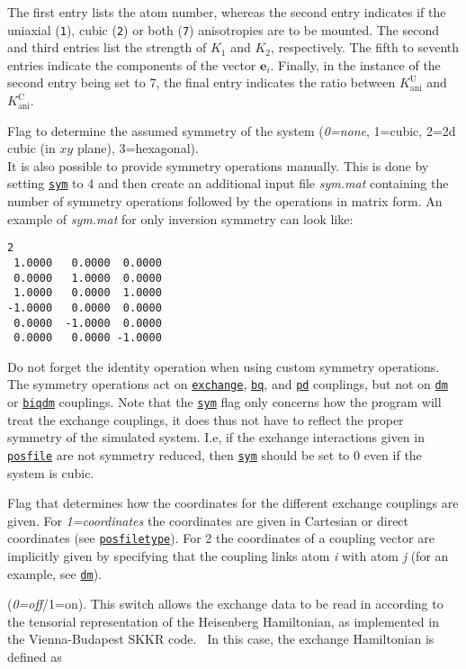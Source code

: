\documentclass[11pt,fleqn,a4]{book} %
\makeatletter
\newcommand{\litem}[1]{\item[\bfseries#1\index{#1@\texttt{#1}}\label{#1}]}
\newcommand{\rkeyword}[1]{\hyperref[#1]{\texttt{#1}}}
\makeatother
\begin{document}
\begin{description}[leftmargin=!,labelwidth=\widthof{\bfseries fifteenchars}]
The first entry lists the atom number, whereas the second entry indicates if the uniaxial (\texttt{1}), cubic (\texttt{2}) or both (\texttt{7}) anisotropies are to be mounted. The second and third entries list the strength of $K_1$ and $K_2$, respectively. The fifth to seventh entries indicate the components of the vector $\mathbf{e}_i$. Finally, in the instance of the second entry being set to 7, the final entry indicates the ratio between  $K^{\mathrm{U}}_{\mathrm{ani}}$ and  $K^{\mathrm{C}}_{\mathrm{ani}}$.

\litem{sym} Flag to determine the assumed symmetry of the system (\emph{0=none}, 1=cubic, 2=2d cubic (in $xy$ plane), 3=hexagonal). \\
            It is also possible to provide symmetry operations manually. This is done by setting \rkeyword{sym} to 4 and then create an additional input file
             {\it sym.mat} containing the number of symmetry operations followed by the operations in matrix form. 
            An example of {\it sym.mat} for only inversion symmetry can look like: 
\begin{fBox} 
\begin{Verbatim}
2 
 1.0000   0.0000  0.0000
 0.0000   1.0000  0.0000
 1.0000   0.0000  1.0000
-1.0000   0.0000  0.0000
 0.0000  -1.0000  0.0000
 0.0000   0.0000 -1.0000
\end{Verbatim}
\end{fBox}
        Do not forget the identity operation when using custom symmetry operations. The symmetry operations act on \rkeyword{exchange}, \rkeyword{bq}, and \rkeyword{pd} couplings, but not on \rkeyword{dm} or \rkeyword{biqdm} couplings. Note that the \rkeyword{sym} flag only concerns how the program will treat the exchange couplings, it does thus not have to reflect the proper symmetry of the simulated system. I.e, if the exchange interactions given in \rkeyword{posfile} are not symmetry reduced, then \rkeyword{sym} should be set to $0$ even if the system is cubic.
\litem{maptype} Flag that determines how the coordinates for the different exchange couplings are given. For \emph{1=coordinates} the coordinates are given in Cartesian or direct coordinates (see \rkeyword{posfiletype}). For 2 the coordinates of a coupling vector are implicitly given by specifying that the coupling links atom \textit{i} with atom \textit{j} (for an example, see \rkeyword{dm}).
\litem{do_jtensor} (\emph{0=off}/1=on). This switch allows the exchange data to be read in according to the tensorial representation of the Heisenberg Hamiltonian, as implemented in the Vienna-Budapest SKKR code.~\cite{Udvardi2003} In this case, the exchange Hamiltonian is defined as


\end{description}
\end{document}
